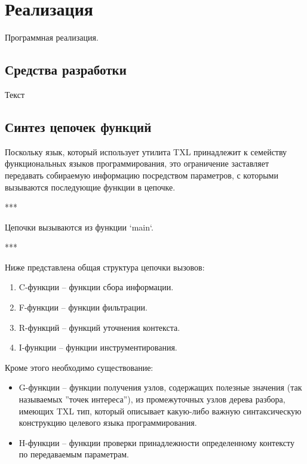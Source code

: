 \chapter{Реализация}

Программная реализация.

\section{Средства разработки}

Текст

\section{Синтез цепочек функций}

Поскольку язык, который использует утилита TXL принадлежит к семейству функциональных языков программирования, это ограничение заставляет передавать собираемую информацию посредством параметров, с которыми вызываются последующие функции в цепочке.

***

Цепочки вызываются из функции `main`.

***

Ниже представлена общая структура цепочки вызовов:
\begin{enumerate}
  \item C-функции -- функции сбора информации.
  \item F-функции -- функции фильтрации.
  \item R-функций -- функций уточнения контекста.
  \item I-функции -- функции инструментирования.
\end{enumerate}

Кроме этого необходимо существование:
\begin{itemize}
  \item G-функции -- функции получения узлов, содержащих полезные значения (так называемых ''точек интереса''), из промежуточных узлов дерева разбора, имеющих TXL тип, который описывает какую-либо важную синтаксическую конструкцию целевого языка программирования.
  \item H-функции -- функции проверки принадлежности определенному контексту по передаваемым параметрам.
\end{itemize}

